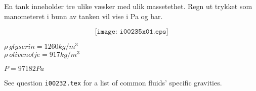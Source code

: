 
En tank inneholder tre ulike væsker med ulik massetethet. Regn ut trykket som manometeret i bunn av tanken vil vise i Pa og bar. 

$$\texttt{[image: i00235x01.eps]}$$

$\rho \: glyserin = 1260 kg/m^3$\\
$\rho \: olivenolje = 917 kg/m^3$\\







$P=97182 Pa$







See question {\tt i00232.tex} for a list of common fluids' specific gravities.




